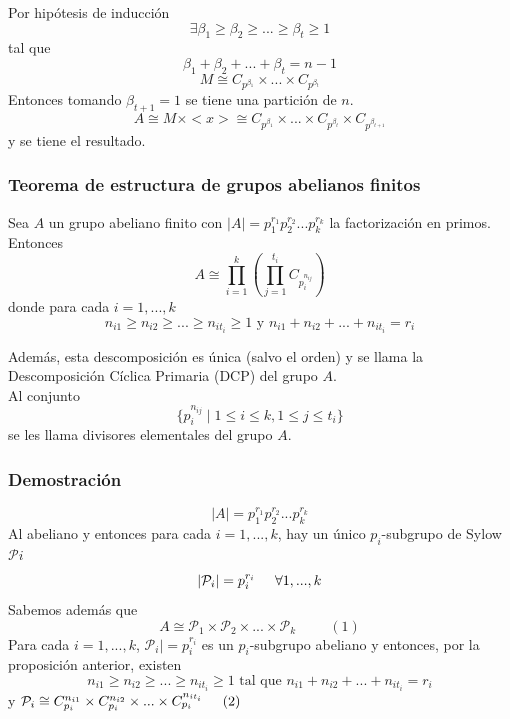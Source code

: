 \documentclass[11pt,a4paper]{article}
\begin{document}
\begin{enumerate*}
\begin{enumerate}[label = Caso \arabic*.]

Por hipótesis de inducción
$$\exists \beta_{1} \geq \beta_{2} \geq ... \geq \beta_{t} \geq 1$$
tal que
$$\beta_{1} + \beta_{2} + ... + \beta_{t} = n-1$$
$$M \cong C_{p^{\beta_{1}}} \times ... \times C_{p^{\beta_{t}}}$$
Entonces tomando $\beta_{t+1} = 1$ se tiene una partición de $n$.
$$A \cong M \times <x> \cong C_{p^{\beta_{1}}} \times ... \times C_{p^{\beta_{t}}} \times C_{p^{\beta_{t+1}}}$$
y se tiene el resultado.
\end{enumerate}
\end{enumerate*}

\subsubsection*{Teorema de estructura de grupos abelianos finitos}

Sea $A$ un grupo abeliano finito con $|A| = p_{1}^{r_{1}} p_{2}^{r_{2}} ... p_{k}^{r_{k}}$ la factorización en primos. Entonces
$$A \cong \prod_{i=1}^{k} (\prod_{j=1}^{t_{i}} C_{p_{i}^{n_{ij}}})$$
donde para cada $i = 1, ..., k$
$$n_{i1} \geq n_{i2} \geq ... \geq n_{it_{i}} \geq 1 \text{ y } n_{i1} + n_{i2} + ... + n_{it_{i}} = r_{i}$$

Además, esta descomposición es única (salvo el orden) y se llama la Descomposición Cíclica Primaria (DCP) del grupo $A$. \\
Al conjunto
$$\{p_{i}^{n_{ij}} \mid 1 \leq i \leq k, 1 \leq j \leq t_{i}\}$$
se les llama divisores elementales del grupo $A$.

\subsubsection*{Demostración}

$$|A| = p_{1}^{r_{1}} p_{2}^{r_{2}} ... p_{k}^{r_{k}}$$
Al abeliano y entonces para cada $i = 1, ..., k$, hay un único $p_{i}$-subgrupo de Sylow $\mathcal{P}{i}$
$$|\mathcal{P}_{i}| = p_{i}^{r_{i}} \hspace{0.5cm} \forall 1, ..., k$$
Sabemos además que
$$A \cong \mathcal{P}_{1} \times \mathcal{P}_{2} \times ... \times \mathcal{P}_{k} \hspace{1cm} (1)$$
Para cada $i = 1, ..., k$, $\mathcal{P}_{i}| = p_{i}^{r_{i}}$ es un $p_{i}$-subgrupo abeliano y entonces, por la proposición anterior, existen
$$n_{i1} \geq n_{i2} \geq ... \geq n_{it_{i}} \geq 1 \text{ tal que } n_{i1} + n_{i2} + ... + n_{it_{i}} = r_{i}$$
y $\mathcal{P}_{i} \cong C_{p_{i}}^{n_{i1}} \times C_{p_{i}}^{n_{i2}} \times ... \times C_{p_{i}}^{n_{it_{i}}} \hspace{0.5cm} (2)$
\end{document}
